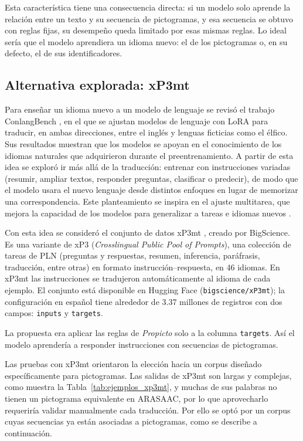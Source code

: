 Esta característica tiene una consecuencia directa: si un modelo solo aprende la relación entre un texto y su secuencia de pictogramas, y esa secuencia se obtuvo con reglas fijas, su desempeño queda limitado por esas mismas reglas. Lo ideal sería que el modelo aprendiera un idioma nuevo: el de los pictogramas o, en su defecto, el de sus identificadores.

\subsection{Alternativa explorada: xP3mt}
Para enseñar un idioma nuevo a un modelo de lenguaje se revisó el trabajo ConlangBench \citep{jeong_conlangbench_2026}, en el que se ajustan modelos de lenguaje con LoRA para traducir, en ambas direcciones, entre el inglés y lenguas ficticias como el élfico. Sus resultados muestran que los modelos se apoyan en el conocimiento de los idiomas naturales que adquirieron durante el preentrenamiento. A partir de esta idea se exploró ir más allá de la traducción: entrenar con instrucciones variadas (resumir, ampliar textos, responder preguntas, clasificar o predecir), de modo que el modelo usara el nuevo lenguaje desde distintos enfoques en lugar de memorizar una correspondencia. Este planteamiento se inspira en el ajuste multitarea, que mejora la capacidad de los modelos para generalizar a tareas e idiomas nuevos \cite{muennighoff2022crosslingual}.

Con esta idea se consideró el conjunto de datos xP3mt \cite{muennighoff2022crosslingual}, creado por BigScience. Es una variante de xP3 (\textit{Crosslingual Public Pool of Prompts}), una colección de tareas de PLN (preguntas y respuestas, resumen, inferencia, paráfrasis, traducción, entre otras) en formato instrucción--respuesta, en 46 idiomas. En xP3mt las instrucciones se tradujeron automáticamente al idioma de cada ejemplo. El conjunto está disponible en Hugging Face (\texttt{bigscience/xP3mt}); la configuración en español tiene alrededor de 3.37 millones de registros con dos campos: \texttt{inputs} y \texttt{targets}.

La propuesta era aplicar las reglas de \textit{Propicto} solo a la columna \texttt{targets}. Así el modelo aprendería a responder instrucciones con secuencias de pictogramas.

Las pruebas con xP3mt orientaron la elección hacia un corpus diseñado específicamente para pictogramas. Las salidas de xP3mt son largas y complejas, como muestra la Tabla~\ref{tab:ejemplos_xp3mt}, y muchas de sus palabras no tienen un pictograma equivalente en ARASAAC, por lo que aprovecharlo requeriría validar manualmente cada traducción. Por ello se optó por un corpus cuyas secuencias ya están asociadas a pictogramas, como se describe a continuación.

